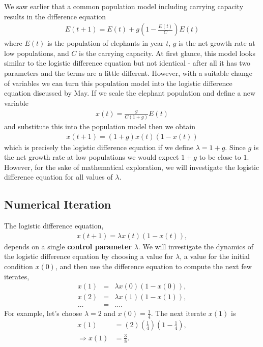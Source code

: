 We saw earlier that a common population model including carrying capacity results in the difference equation
\begin{eqnarray*}
E(t+1) = E(t) + g(1 - \frac{E(t)}{C}) E(t)
\end{eqnarray*}
where $E(t)$ is the population of elephants in year $t$, $g$ is the net growth rate at low populations, and $C$ is the carrying capacity. At first glance, this model looks similar to the logistic difference equation but not identical - after all it has two parameters and the terms are a little different. However, with a suitable change of variables we can turn this population model into the logistic difference equation discussed by May. If we scale the elephant population and define a new variable
\begin{eqnarray*}
x(t) = \frac{g}{C(1+g)} E(t)
\end{eqnarray*}
and substitute this into the population model then we obtain
\begin{eqnarray*}
x(t+1) = (1+g) x(t) (1-x(t))
\end{eqnarray*}
which is precisely the logistic difference equation if we define $\lambda = 1 + g$. Since $g$ is the net growth rate at low populations we would expect $1+g$ to be close to $1$. However, for the sake of mathematical exploration, we will investigate the logistic difference equation for all values of $\lambda$.
 
\subsection*{Numerical Iteration}

The logistic difference equation,
\begin{eqnarray}
x(t+1) = \lambda x(t) (1-x(t)),
\end{eqnarray}
depends on a single {\bf control parameter} $\lambda$. We will investigate the dynamics of the logistic difference equation by choosing a value for $\lambda$, a value for the initial condition $x(0)$, and then use the difference equation to compute the next few  iterates,
\begin{eqnarray*}
x(1) &=& \lambda x(0) (1-x(0)), \\
x(2) &=& \lambda x(1) (1 - x(1)), \\
\ldots &=& \ldots.
\end{eqnarray*}
For example, let's choose $\lambda = 2$ and $x(0) =\frac{1}{4}$. The next iterate $x(1)$ is
\begin{align*}
x(1) &= (2) (\frac{1}{4})  (1 - \frac{1}{4}), \\
\Rightarrow x(1) &= \frac{3}{8}.
\end{align*} 

